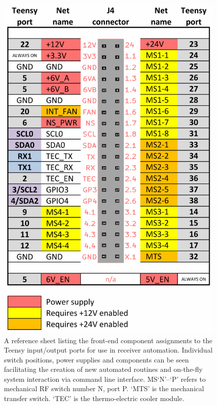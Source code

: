 \begin{figure}
    \centering
    \includegraphics{controller_pinout}
    \caption{A reference sheet listing the front-end component assignments to the Teensy input/output ports for use in receiver automation. Individual switch positions, power supplies and components can be seen facilitating the creation of new automated routines and on-the-fly system interaction via command line interface. MS‘N’--‘P’ refers to mechanical RF switch number N, port P. ‘MTS’ is the mechanical transfer switch. ‘TEC’ is the thermo-electric cooler module.}
    \label{fig:controller_pinout}
\end{figure}

